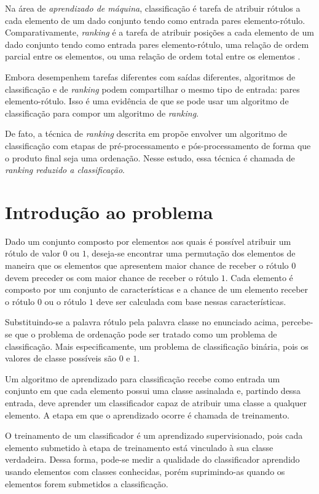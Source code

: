 Na área de \emph{aprendizado de máquina}, classificação é tarefa de atribuir rótulos a cada elemento de um dado conjunto tendo como entrada pares elemento-rótulo. Comparativamente, \emph{ranking} é a tarefa de atribuir posições a cada elemento de um dado conjunto tendo como entrada pares elemento-rótulo, uma relação de ordem parcial entre os elementos, ou uma relação de ordem total entre os elementos \cite{tieyan09}.

Embora desempenhem tarefas diferentes com saídas diferentes, algoritmos de classificação e de \emph{ranking} podem compartilhar o mesmo tipo de entrada: pares elemento-rótulo. Isso é uma evidência de que se pode usar um algoritmo de classificação para compor um algoritmo de \emph{ranking}.

De fato, a técnica de \emph{ranking} descrita em \cite{langford08} propõe envolver  um algoritmo de classificação com etapas de pré-processamento e pós-processamento de forma que o produto final seja uma ordenação. Nesse estudo, essa técnica é chamada de \emph{ranking reduzido a classificação}.

\section{Introdução ao problema}

Dado um conjunto composto por elementos aos quais é possível atribuir um rótulo de valor $0$ ou $1$, deseja-se encontrar uma permutação dos elementos de maneira que os elementos que apresentem maior chance de receber o rótulo $0$ devem preceder os com maior chance de receber o rótulo $1$. Cada elemento é composto por um conjunto de características e a chance de um elemento receber o rótulo $0$ ou o rótulo $1$ deve ser calculada com base nessas características.

Substituindo-se a palavra rótulo pela palavra classe no enunciado acima, percebe-se que o problema de ordenação pode ser tratado como um problema de classificação. Mais especificamente, um problema de classificação binária, pois os valores de classe possíveis são $0$ e $1$.

Um algoritmo de aprendizado para classificação recebe como entrada um conjunto em que cada elemento possui uma classe assinalada e, partindo dessa entrada, deve aprender um classificador capaz de atribuir uma classe a qualquer elemento. A etapa em que o aprendizado ocorre é chamada de treinamento.

O treinamento de um classificador é um aprendizado supervisionado, pois cada elemento submetido à etapa de treinamento está vinculado à sua classe verdadeira. Dessa forma, pode-se medir a qualidade do classificador aprendido usando elementos com classes conhecidas, porém suprimindo-as quando os elementos forem submetidos a classificação.

